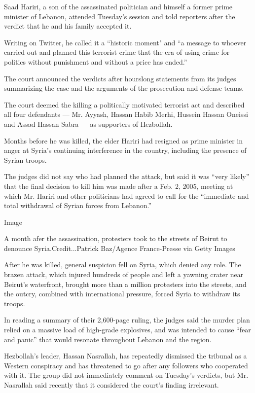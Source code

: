 Saad Hariri, a son of the assassinated politician and himself a former
prime minister of Lebanon, attended Tuesday's session and told reporters
after the verdict that he and his family accepted it.

Writing on Twitter, he called it a ``historic moment" and ``a message to
whoever carried out and planned this terrorist crime that the era of
using crime for politics without punishment and without a price has
ended.''

The court announced the verdicts after hourslong statements from its
judges summarizing the case and the arguments of the prosecution and
defense teams.

The court deemed the killing a politically motivated terrorist act and
described all four defendants --- Mr. Ayyash, Hassan Habib Merhi,
Hussein Hassan Oneissi and Assad Hassan Sabra --- as supporters of
Hezbollah.

Months before he was killed, the elder Hariri had resigned as prime
minister in anger at Syria's continuing interference in the country,
including the presence of Syrian troops.

The judges did not say who had planned the attack, but said it was
``very likely'' that the final decision to kill him was made after a
Feb. 2, 2005, meeting at which Mr. Hariri and other politicians had
agreed to call for the ``immediate and total withdrawal of Syrian forces
from Lebanon.''

Image

A month afer the assassination, protesters took to the streets of Beirut
to denounce Syria.Credit...Patrick Baz/Agence France-Presse via Getty
Images

After he was killed, general suspicion fell on Syria, which denied any
role. The brazen attack, which injured hundreds of people and left a
yawning crater near Beirut's waterfront, brought more than a million
protesters into the streets, and the outcry, combined with international
pressure, forced Syria to withdraw its troops.

In reading a summary of their 2,600-page ruling, the judges said the
murder plan relied on a massive load of high-grade explosives, and was
intended to cause ``fear and panic'' that would resonate throughout
Lebanon and the region.

Hezbollah's leader, Hassan Nasrallah, has repeatedly dismissed the
tribunal as a Western conspiracy and has threatened to go after any
followers who cooperated with it. The group did not immediately comment
on Tuesday's verdicts, but Mr. Nasrallah said recently that it
considered the court's finding irrelevant.

